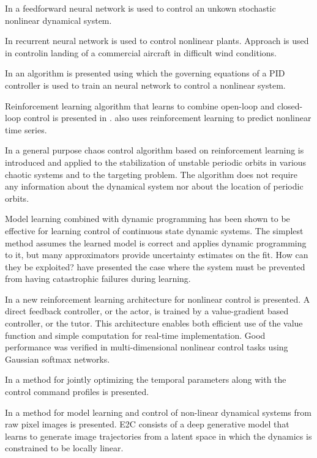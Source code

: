 \documentclass[conference]{IEEEtran}
\begin{document}
In \cite{milito1991nips} a feedforward neural network is used to control an unkown stochastic nonlinear dynamical system.

In \cite{lippmann1991nips} recurrent neural network is used to control nonlinear plants. Approach is used in controlin landing of a commercial aircraft in difficult wind conditions.

In \cite{scott1992nips} an algorithm is presented using which the governing equations of a PID controller is used to train an neural network to control a nonlinear system.

Reinforcement learning algorithm that learns to combine open-loop and closed-loop control is presented in \cite{HBZnips96}. \cite{takashi2005nonlinear} also uses reinforcement learning to predict nonlinear time series.

In \cite{sabino1999chaos} a general purpose chaos control algorithm based on reinforcement learning is introduced and applied to the stabilization of unstable periodic orbits in various chaotic systems and to the targeting problem. The algorithm does not require any information about the dynamical system nor about the
location of periodic orbits.

Model learning combined with dynamic programming has been shown to be effective for learning control of continuous state dynamic systems. The simplest method assumes the learned model is correct and applies dynamic programming to it, but many approximators provide uncertainty estimates on the fit. How can they be exploited? \cite{schnider1997nips} have presented the case where the system must be prevented from having catastrophic failures during learning.

In \cite{doya1997nips} a new reinforcement learning architecture for nonlinear control is presented. A direct feedback controller, or the actor, is trained by a value-gradient based controller, or the tutor. This architecture enables both efficient use of the value function and simple computation for real-time implementation. Good performance was verified in multi-dimensional nonlinear control tasks using Gaussian softmax networks.

In \cite{rawlik2010nips} a method for jointly optimizing the temporal parameters along with the control command profiles is presented.

In \cite{watter2015nips} a method for model learning and control of non-linear dynamical systems from raw pixel images is presented. E2C consists of a deep generative model that learns to generate image trajectories from a latent space in which the dynamics is constrained to be locally linear.
\end{document}

